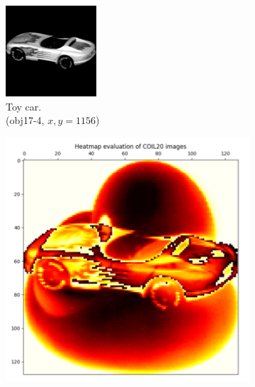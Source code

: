 \begin{figure}[!]
     \centering
     \begin{subfigure}[t]{0.32\columnwidth}
    	\centering
    	\includegraphics[width=\columnwidth]{images/coil-20-proc/obj17__4.png}
    	\caption{Toy car. \\ (obj17-4, $x,y=1156$)}
        \label{fig:obj17__4}
    \end{subfigure}
     \hfill
     \begin{subfigure}[t]{0.32\columnwidth}
    	\centering
    	\includegraphics[width=\columnwidth]{images/heatmap_coil20_worst.png}

\end{subfigure}
\end{figure}
